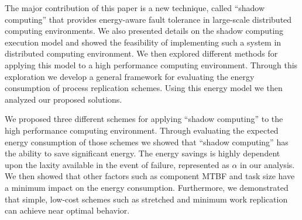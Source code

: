 
The major contribution of this paper is a new technique, called
``shadow computing'' that provides energy-aware fault tolerance in
large-scale distributed computing environments. We also presented
details on the shadow computing execution model and showed the
feasibility of implementing such a system in distributed computing
environment. We then explored different methods for applying this model
to a high performance computing environment. Through this exploration
we develop a general framework for evaluating the energy consumption
of process replication schemes. Using this energy model we then
analyzed our proposed solutions.

We proposed three different schemes for applying ``shadow computing''
to the high performance computing environment. Through evaluating the
expected energy consumption of those schemes we showed that ``shadow
computing'' has the ability to save significant energy. The energy
savings is highly dependent upon the laxity available in the event of
failure, represented as $\alpha$ in our analysis. We then showed that
other factors such as component MTBF and task size have a minimum
impact on the energy consumption. Furthermore, we demonstrated that
simple, low-cost schemes such as stretched and minimum work
replication can achieve near optimal behavior.
